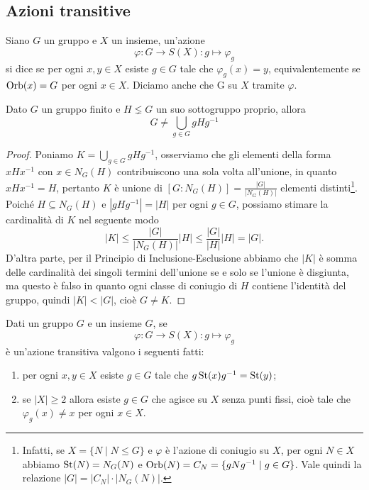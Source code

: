 \documentclass[11pt]{scrartcl}
\begin{document}
\subsection{Azioni transitive}

\begin{definition}
    Siano $G$ un gruppo e $X$ un insieme, un'azione \[
        \varphi:G\longrightarrow S(X) :g \longmapsto \varphi_g
    \]si dice  se per ogni $x, y \in X$ esiste $g \in G$
    tale che $\varphi_g(x) = y$, equivalentemente se $\operatorname{Orb}(x) = G$ per ogni 
    $x \in X$. Diciamo anche che G  su $X$ 
    tramite $\varphi$.
\end{definition}

\begin{lemma}
    \label{lemma2.0}
    Dato $G$ un gruppo finito e $H \lneq G$ un suo sottogruppo proprio, allora \[
        G \neq \bigcup_{g \in G}gHg^{-1}
    \]
\end{lemma}

\begin{proof}
    Poniamo $K = \displaystyle\bigcup_{g \in G}gHg^{-1}$, osserviamo che gli
    elementi della forma $xHx^{-1}$ con $x \in N_G(H)$ contribuiscono una
    sola volta all'unione, in quanto $xHx^{-1} = H$, pertanto $K$
    è unione di $[G:N_G(H)] = \displaystyle\frac{|G|}{|N_G(H)|}$ elementi distinti\footnote
    {Infatti, se $X = \{N\mid N\leqslant G\}$ e $\varphi$ è l'azione di coniugio
    su $X$, per ogni $N \in X$ abbiamo $\operatorname{St}(N) = N_G(N)$ e $\operatorname{Orb}(N) = C_N =
    \{gNg^{-1}\mid g \in G\}$. Vale quindi la relazione $|G| = |C_N|\cdot|N_G(N)|$.}. Poiché
    $H \subseteq N_G(H)$ e $|gHg^{-1}| = |H|$ per ogni $g \in G$, possiamo stimare 
    la cardinalità di $K$ nel seguente modo 
    \[
        |K| \leqslant\frac{|G|}{|N_G(H)|}|H| \leqslant\frac{|G|}{|H|}|H| = |G|.
    \]D'altra parte, per il Principio di Inclusione-Esclusione abbiamo che $|K|$ 
    è somma delle cardinalità dei singoli termini dell'unione se e solo se 
    l'unione è disgiunta, ma questo è falso in quanto ogni classe di coniugio
    di $H$ contiene l'identità del gruppo, quindi $|K| < |G|$, cioè $G \neq K$.
\end{proof}

\begin{proposition}
    Dati un gruppo $G$ e un insieme $G$, se 
    \[
        \varphi:G\longrightarrow S(X) :g\longmapsto \varphi_g
    \]è un'azione transitiva valgono i seguenti fatti:
    \begin{enumerate}[(1)]
        \item per ogni $x, y \in X$ esiste $g \in G$ tale che $g\operatorname{St}(x)g^{-1} = \operatorname{St}(y)$;
        \item se $|X|\geqslant 2$ allora esiste $g \in G$ che agisce su $X$ senza
        punti fissi, cioè tale che $\varphi_g(x) \neq x$ per ogni $x \in X$.
    \end{enumerate}
\end{proposition}
\end{document}
